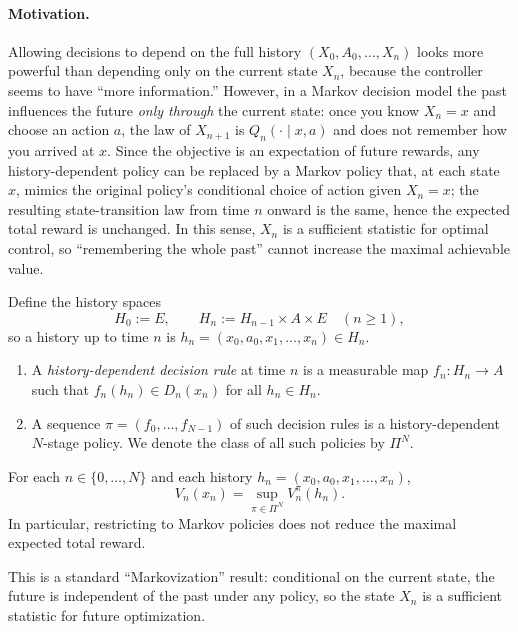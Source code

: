 \paragraph{Motivation.}
Allowing decisions to depend on the full history $(X_0,A_0,\dots,X_n)$ looks more powerful than depending only on the current state $X_n$, because the controller seems to have ``more information.'' However, in a Markov decision model the past influences the future \emph{only through} the current state: once you know $X_n=x$ and choose an action $a$, the law of $X_{n+1}$ is $Q_n(\cdot\mid x,a)$ and does not remember how you arrived at $x$. Since the objective is an expectation of future rewards, any history-dependent policy can be replaced by a Markov policy that, at each state $x$, mimics the original policy’s conditional choice of action given $X_n=x$; the resulting state-transition law from time $n$ onward is the same, hence the expected total reward is unchanged. In this sense, $X_n$ is a sufficient statistic for optimal control, so ``remembering the whole past'' cannot increase the maximal achievable value.


Define the history spaces
\[
H_0:=E,\qquad H_n := H_{n-1}\times A\times E\quad (n\ge 1),
\]
so a history up to time $n$ is $h_n=(x_0,a_0,x_1,\dots,x_n)\in H_n$.
\begin{definition}
\leavevmode
\begin{enumerate}[label=(\alph*)]  
  \item A \emph{history-dependent decision rule} at time $n$ is a measurable map $f_n:H_n\to A$ such that $f_n(h_n)\in D_n(x_n)$ for all $h_n\in H_n$.
  \item A sequence $\pi=(f_0,\dots,f_{N-1})$ of such decision rules is a history-dependent $N$-stage policy.
  We denote the class of all such policies by $\Pi^N$.
\end{enumerate}
\end{definition}

\begin{theorem}
For each $n\in\{0,\dots,N\}$ and each history $h_n=(x_0,a_0,x_1,\dots,x_n)$,
\[
V_n(x_n) = \sup_{\pi\in \Pi^N} V_n^{\pi}(h_n).
\]
In particular, restricting to Markov policies does not reduce the maximal expected total reward.
\end{theorem}

\begin{remark}
This is a standard ``Markovization'' result: conditional on the current state, the future is independent of the past under any policy, so the state $X_n$ is a sufficient statistic for future optimization.
\end{remark}



